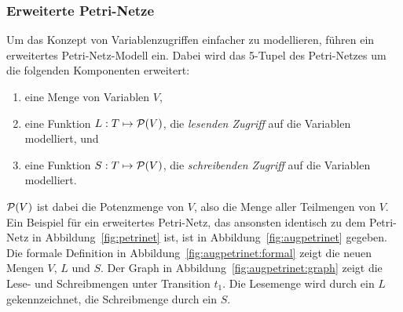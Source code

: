 \subsubsection{Erweiterte Petri-Netze}
Um das Konzept von Variablenzugriffen einfacher zu modellieren, führen \textcite{Goel1990} ein erweitertes Petri-Netz-Modell ein. Dabei wird das 5-Tupel des Petri-Netzes um die folgenden Komponenten erweitert:
\begin{enumerate}
	\item eine Menge von Variablen $V$,
	\item eine Funktion $L: T \mapsto \mathcal{P}(V)$, die \emph{lesenden Zugriff} auf die Variablen modelliert, und
	\item eine Funktion $S: T \mapsto \mathcal{P}(V)$, die \emph{schreibenden Zugriff} auf die Variablen modelliert.
\end{enumerate}
$\mathcal{P}(V)$ ist dabei die Potenzmenge von $V$, also die Menge aller Teilmengen von $V$.
Ein Beispiel für ein erweitertes Petri-Netz, das ansonsten identisch zu dem Petri-Netz in Abbildung~\ref{fig:petrinet} ist, ist in Abbildung~\ref{fig:augpetrinet} gegeben. Die formale Definition in Abbildung~\ref{fig:augpetrinet:formal} zeigt die neuen Mengen $V$, $L$ und $S$. Der Graph in Abbildung~\ref{fig:augpetrinet:graph} zeigt die Lese- und Schreibmengen unter Transition $t_1$. Die Lesemenge wird durch ein $L$ gekennzeichnet, die Schreibmenge durch ein $S$. 
